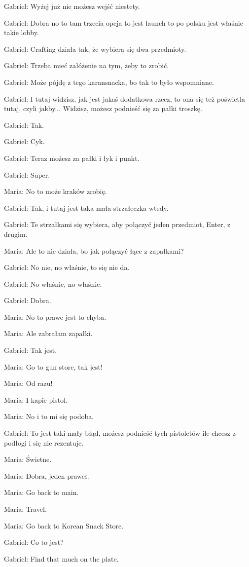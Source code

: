 Gabriel: Wyżej już nie możesz wejść niestety.

Gabriel: Dobra no to tam trzecia opcja to jest launch to po polsku jest właśnie takie lobby.

Gabriel: Crafting działa tak, że wybiera się dwa przedmioty.

Gabriel: Trzeba mieć załóżenie na tym, żeby to zrobić.

Gabriel: Może pójdę z tego karansnacka, bo tak to było wspomniane.

Gabriel: I tutaj widzisz, jak jest jakaś dodatkowa rzecz, to ona się też poświetla tutaj, czyli jakby... Widzisz, możesz podnieść się za pałki troszkę.

Gabriel: Tak.

Gabriel: Cyk.

Gabriel: Teraz możesz za pałki i łyk i punkt.

Gabriel: Super.

Maria: No to może kraków zrobię.

Gabriel: Tak, i tutaj jest taka mała strzałeczka wtedy.

Gabriel: Te strzałkami się wybiera, aby połączyć jeden przedmiot, Enter, z drugim.

Maria: Ale to nie działa, bo jak połączyć łące z zapałkami?

Gabriel: No nie, no właśnie, to się nie da.

Gabriel: No właśnie, no właśnie.

Gabriel: Dobra.

Maria: No to prawe jest to chyba.

Maria: Ale zabrałam zapałki.

Gabriel: Tak jest.

Maria: Go to gun store, tak jest!

Maria: Od razu!

Maria: I kapie pistol.

Maria: No i to mi się podoba.

Gabriel: To jest taki mały błąd, możesz podnieść tych pistoletów ile chcesz z podłogi i się nie rezentuje.

Maria: Świetne.

Maria: Dobra, jeden praweł.

Maria: Go back to main.

Maria: Travel.

Maria: Go back to Korean Snack Store.

Gabriel: Co to jest?

Gabriel: Find that much on the plate.

